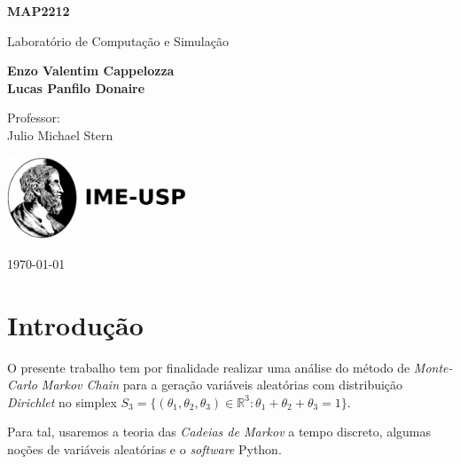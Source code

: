 \documentclass[12pt, a4paper]{article}
\begin{document}
\begin{titlepage}
    \begin{center}
        \vspace*{3cm}
            
        \Huge
        \textbf{MAP2212}
            
        \vspace{1cm}
        \huge
        Laboratório de Computação e Simulação \\
            
        \vspace{1.5cm}
        \Large
            
        \textbf{Enzo Valentim Cappelozza \\ Lucas Panfilo Donaire}                      %
        
            
        \vfill
        
        Professor:  \\
        Julio Michael Stern
            
        \vspace{1cm}
            
        \includegraphics[width=0.4\textwidth]{2_49.png}
        \\
        
        \Large
        
        \today
            
    \end{center}
\end{titlepage}


\newpage
\section{Introdução}
O presente trabalho tem por finalidade realizar uma análise do método de \textit{Monte-Carlo Markov Chain} para a geração variáveis aleatórias com distribuição \textit{Dirichlet} no simplex $S_3 = \{(\theta_1, \theta_2, \theta_3) \in \mathbb{R}^3 : \theta_1 +  \theta_2 + \theta_3 = 1\}$.

Para tal, usaremos a teoria das \textit{Cadeias de Markov} a tempo discreto, algumas noções de variáveis aleatórias e o \textit{software} Python. 
\end{document}
